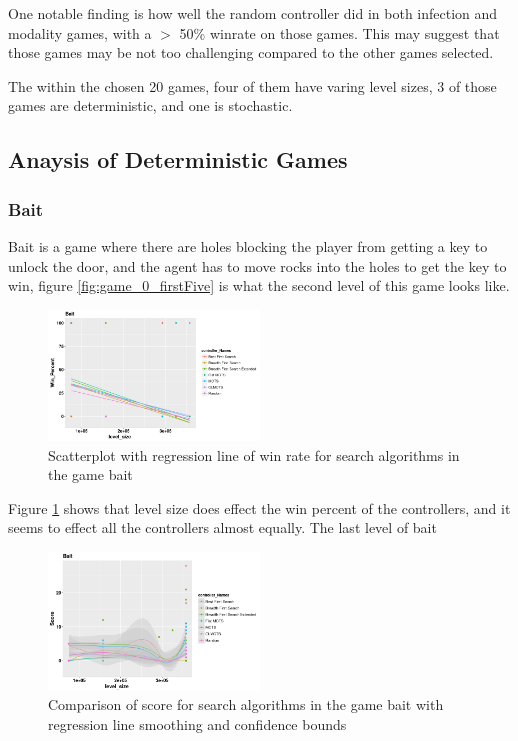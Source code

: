 \documentclass[journal]{IEEEtran}
\begin{document}
	One notable finding is how well the random controller did in both infection and modality games, with a $>$ 50\% winrate on those games. This may suggest that those games may be not too challenging compared to the other games selected.

	
	The within the chosen 20 games, four of them have varing level sizes, 3 of those games are deterministic, and one is stochastic.
	 \subsection{Anaysis of Deterministic Games}

		\subsubsection{Bait}
		Bait is a game where there are holes blocking the player from getting a key to unlock the door, and the agent has to move rocks into the holes to get the key to win, figure \ref{fig:game_0_firstFive} is what the second level  of this game looks like.
		\begin{figure}[h]
		    \centering
		    \includegraphics[width=0.5\textwidth]{Scatter/game_0_win}
		    \caption{ Scatterplot with regression line of win rate for search algorithms in the game bait }
		    \label{fig:game_0_win}
		\end{figure}
	Figure \ref{fig:game_0_win} shows that level size does effect the win percent of the controllers, and it seems to effect all the controllers almost equally. The last level of bait
		\begin{figure}[h]
		    \centering
		    \includegraphics[width=0.5\textwidth]{Scatter/game_0_score_smoothing_confidence}
		    \caption{ Comparison of score for search algorithms in the game bait with regression line smoothing and confidence bounds}
		    \label{fig:game_0_win_smoothing}
		\end{figure}
\end{document}
